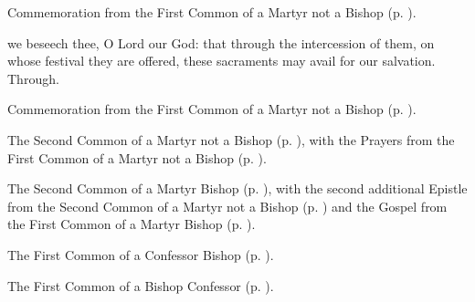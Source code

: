 \begin{rubric}
    Commemoration  from the First Common of a Martyr not a Bishop (p. \pageref{CommonMartyrNotBishopI}).
\end{rubric}


\postcommunion
{} we beseech thee, O Lord our God: that through the intercession of them, on whose festival they are offered, these sacraments may avail for our salvation. Through.

\begin{rubric}
    Commemoration  from the First Common of a Martyr not a Bishop (p. \pageref{CommonMartyrNotBishopI}).
\end{rubric}



\begin{rubric}
	The Second Common of a Martyr not a Bishop (p. \pageref{CommonMartyrNotBishopII}), with the Prayers from the First Common of a Martyr not a Bishop (p. \pageref{CommonMartyrNotBishopI}).
\end{rubric}


\clearpage
{}

\begin{rubric}
	The Second Common of a Martyr Bishop (p. \pageref{CommonMartyrBishopII}), with the second additional Epistle from the Second Common of a Martyr not a Bishop (p. \pageref{1Peter413}) and the Gospel from the First Common of a Martyr Bishop (p. \pageref{CommonMartyrBishopI}).
\end{rubric}



\begin{rubric}
	The First Common of a Confessor Bishop (p. \pageref{CommonConfessorBishopI}).
\end{rubric}



\begin{rubric}
	The First Common of a Bishop Confessor (p. \pageref{CommonConfessorBishopI}).
\end{rubric}



